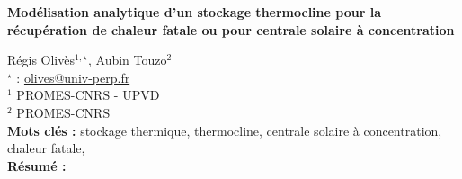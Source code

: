 


    \newpage


%
\begin{flushleft}
\addtocounter{section}{1}
{\Large \textbf{Modélisation analytique d'un stockage thermocline pour la récupération de chaleur fatale ou pour centrale solaire à concentration}}\label{ref:18}
\end{flushleft}
%
Régis Olivès$^{1,\star}$, Aubin Touzo$^{2}$\\[2mm]
$^{\star}$ \Letter : \url{olives@univ-perp.fr}\\[2mm]
{\footnotesize $^{1}$ PROMES-CNRS - UPVD}\\
{\footnotesize $^{2}$ PROMES-CNRS}\\
[4mm]
%
\noindent \textbf{Mots clés : } stockage thermique, thermocline, centrale solaire à concentration, chaleur fatale,\\[4mm]
%
\noindent \textbf{Résumé : } 

